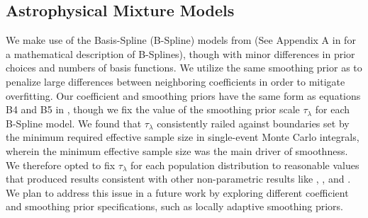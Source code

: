 
\subsection{Astrophysical Mixture Models} \label{sec:astromodels} 

We make use of the Basis-Spline (B-Spline) models from \cite{2022arXiv221012834E} (See Appendix A in \brucepaper{} for a mathematical description of B-Splines), though with minor differences in prior choices and numbers of basis functions. We utilize the same smoothing prior as \brucepaper{} to penalize large differences between neighboring coefficients in order to mitigate overfitting. Our coefficient and smoothing priors have the same form as equations B4 and B5 in \brucepaper{}, though we fix the value of the smoothing prior scale $\tau_\lambda$ for each B-Spline model. We found that $\tau_\lambda$ consistently railed against boundaries set by the minimum required effective sample size in single-event Monte Carlo integrals, wherein the minimum effective sample size was the main driver of smoothness. We therefore opted to fix $\tau_\lambda$ for each population distribution to reasonable values that produced results consistent with other non-parametric results like \citet{2022ApJ...924..101E}, \brucepaper{}, and \citet{10.48550/arXiv.2302.07289}. We plan to address this issue in a future work by exploring different coefficient and smoothing prior specifications, such as locally adaptive smoothing priors. 

